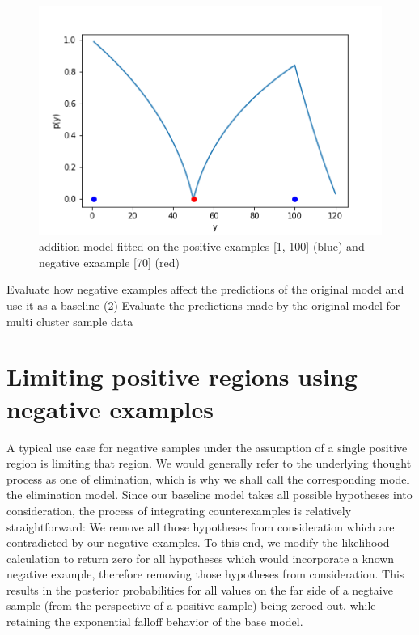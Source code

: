 \documentclass[12pt, ]{scrartcl}
\begin{document}
\begin{multicols}{2}
\begin{figure}[H]
	\includegraphics[scale=0.5]{graphics/addition_model_multiple_regions}
	\caption{addition model fitted on the positive examples [1, 100] (blue) and negative exaample [70] (red)}
	\label{fig:add}
\end{figure}
Evaluate how negative examples affect the predictions of the original model and use it as a baseline
(2) Evaluate the predictions made by the original model for multi cluster sample data
	 
	
\section{Limiting positive regions using negative examples}
A typical use case for negative samples under the assumption of a single positive region is limiting that region.
We would generally refer to the underlying thought process as one of elimination, which is why we shall call the corresponding model the elimination model.
Since our baseline model takes all possible hypotheses into consideration, the process of integrating counterexamples is relatively straightforward: We remove all those hypotheses from consideration which are contradicted by our negative examples.
To this end, we modify the likelihood calculation to return zero for all hypotheses which would incorporate a known negative example, therefore removing those hypotheses from consideration.
This results in the posterior probabilities for all values on the far side of a negtaive sample (from the perspective of a positive sample) being zeroed out, while retaining the exponential falloff behavior of the base model.


\end{multicols}
\end{document}
